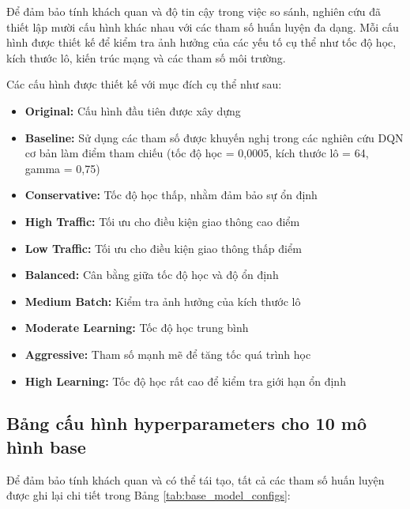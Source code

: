 Để đảm bảo tính khách quan và độ tin cậy trong việc so sánh, nghiên cứu đã thiết
lập mười cấu hình khác nhau với các tham số huấn luyện đa dạng. Mỗi cấu hình
được thiết kế để kiểm tra ảnh hưởng của các yếu tố cụ thể như tốc độ học, kích thước
lô, kiến trúc mạng và các tham số môi trường.

Các cấu hình được thiết kế với mục đích cụ thể như sau:
\begin{itemize}
    \item \textbf{Original:} Cấu hình đầu tiên được xây dựng
    
    \item \textbf{Baseline:} Sử dụng các tham số được khuyến nghị trong các nghiên cứu DQN cơ bản làm điểm tham chiếu (tốc độ học = 0,0005, kích thước lô = 64, gamma = 0,75) 

    \item \textbf{Conservative:} Tốc độ học thấp, nhằm đảm bảo sự ổn định

    \item \textbf{High Traffic:} Tối ưu cho điều kiện giao thông cao điểm

    \item \textbf{Low Traffic:} Tối ưu cho điều kiện giao thông thấp điểm

    \item \textbf{Balanced:} Cân bằng giữa tốc độ học và độ ổn định

    \item \textbf{Medium Batch:} Kiểm tra ảnh hưởng của kích thước lô

    \item \textbf{Moderate Learning:} Tốc độ học trung bình


    \item \textbf{Aggressive:} Tham số mạnh mẽ để tăng tốc quá trình học

    \item \textbf{High Learning:} Tốc độ học rất cao để kiểm tra giới hạn ổn định
\end{itemize}

\subsection{Bảng cấu hình hyperparameters cho 10 mô hình base}

Để đảm bảo tính khách quan và có thể tái tạo, tất cả các tham số huấn luyện được ghi lại chi tiết trong Bảng \ref{tab:base_model_configs}:

